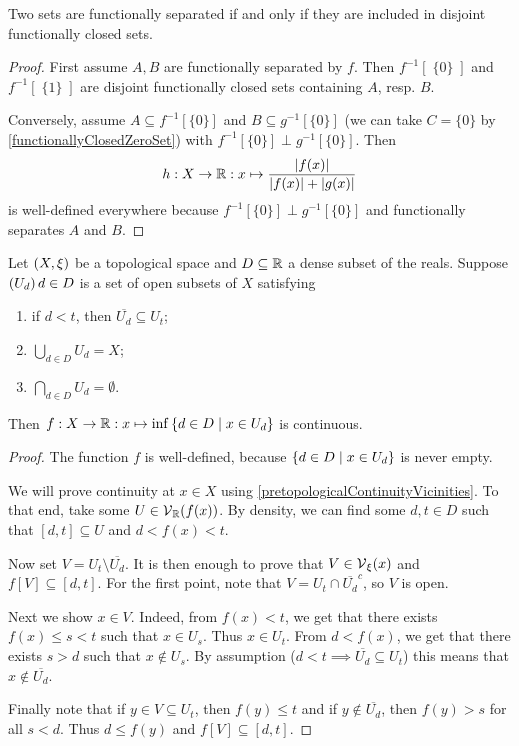 \begin{proposition}
Two sets are functionally separated \textup{if and only if} they are included in disjoint functionally closed sets.
\end{proposition}
\begin{proof}
First assume $A,B$ are functionally separated by $f$. Then $f^{-1}[\;\{0\}\;]$ and $f^{-1}[\;\{1\}\;]$ are disjoint functionally closed sets containing $A$, resp. $B$.

Conversely, assume $A\subseteq f^{-1}[\{0\}]$ and $B\subseteq g^{-1}[\{0\}]$ (we can take $C = \{0\}$ by \ref{functionallyClosedZeroSet}) with $f^{-1}[\{0\}]\perp g^{-1}[\{0\}]$. Then
\[ h: X\to \mathbb{R}: x\mapsto \frac{|f(x)|}{|f(x)|+|g(x)|} \]
is well-defined everywhere because $f^{-1}[\{0\}]\perp g^{-1}[\{0\}]$ and functionally separates $A$ and $B$.
\end{proof}

\begin{lemma} \label{UrysohnsLemmaLemma}
Let $\left( X,\xi \right)$ be a topological space and $D\subseteq \mathbb{R}$ a dense subset of the reals. Suppose $\left( U_d \right){d\in D}$ is a set of open subsets of $X$ satisfying
\begin{enumerate}
\item if $d < t$, then $\overline{U_d}\subseteq U_t$;
\item $\bigcup_{d\in D}U_d = X$;
\item $\bigcap_{d\in D}U_d = \emptyset$.
\end{enumerate}
Then $f: X\to \R: x\mapsto \inf\setbuilder{d\in D}{x\in U_d}$ is continuous.
\end{lemma}
\begin{proof}
The function $f$ is well-defined, because $\setbuilder{d\in D}{x\in U_d}$ is never empty.

We will prove continuity at $x\in X$ using \ref{pretopologicalContinuityVicinities}. To that end, take some $U\in \operatorname{\mathcal{V}}_{\mathbb{R}}(f(x))$. By density, we can find some $d,t\in D$ such that $[d,t]\subseteq U$ and $d < f(x) < t$.

Now set $V = U_t\setminus\overline{U_d}$. It is then enough to prove that $V\in \operatorname{\mathcal{V}}_\xi(x)$ and $f[V]\subseteq [d,t]$. For the first point, note that $V = U_t\cap\overline{U_d}^c$, so $V$ is open.

Next we show $x\in V$. Indeed, from $f(x) < t$, we get that there exists $f(x) \leq s < t$ such that $x\in U_s$. Thus $x\in U_t$. From $d < f(x)$, we get that there exists $s>d$ such that $x\notin U_s$. By assumption ($d < t \implies \overline{U_d}\subseteq U_t$) this means that $x\notin \overline{U_d}$.

Finally note that if $y\in V \subseteq U_t$, then $f(y) \leq t$ and if $y\notin \overline{U_d}$, then $f(y) > s$ for all $s< d$. Thus $d \leq f(y)$ and $f[V]\subseteq [d,t]$.
\end{proof}

